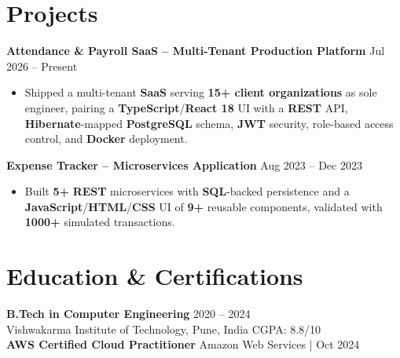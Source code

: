 \documentclass[a4paper,10pt]{article}
\begin{document}
\section*{Projects}

\textbf{Attendance \& Payroll SaaS -- Multi-Tenant Production Platform} \hfill Jul 2026 -- Present
\begin{itemize}[leftmargin=*]
    \item Shipped a multi-tenant \textbf{SaaS} serving \textbf{15+ client organizations} as sole engineer, pairing a \textbf{TypeScript}/\textbf{React 18} UI with a \textbf{REST} API, \textbf{Hibernate}-mapped \textbf{PostgreSQL} schema, \textbf{JWT} security, role-based access control, and \textbf{Docker} deployment.
\end{itemize}

\textbf{Expense Tracker -- Microservices Application} \hfill Aug 2023 -- Dec 2023 \\
\begin{itemize}[leftmargin=*]
    \item Built \textbf{5+} \textbf{REST} microservices with \textbf{SQL}-backed persistence and a \textbf{JavaScript}/\textbf{HTML}/\textbf{CSS} UI of \textbf{9+} reusable components, validated with \textbf{1000+} simulated transactions.
\end{itemize}

\section*{Education \& Certifications}
\textbf{B.Tech in Computer Engineering} \hfill 2020 -- 2024 \\
Vishwakarma Institute of Technology, Pune, India \hfill CGPA: 8.8/10 \\
\textbf{AWS Certified Cloud Practitioner} \hfill Amazon Web Services \;|\; Oct 2024
\end{document}
